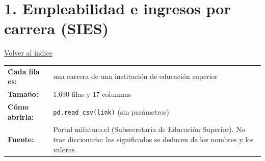 \documentclass[10.5pt]{article}
\begin{document}
\section*{1. Empleabilidad e ingresos por carrera (SIES)}
\vspace{-6pt}\hfill{\small\hyperlink{indice}{\textcolor{azuloscuro}{\underline{Volver al índice}}}}\par\vspace{2pt}
\begin{tabularx}{\linewidth}{@{}l X@{}}\textbf{Cada fila es:} & una carrera de una institución de educación superior \\\textbf{Tamaño:} & 1.690 filas y 17 columnas \\\textbf{Cómo abrirla:} & \texttt{pd.read\_\allowbreak{}csv(link)} (sin parámetros) \\\textbf{Fuente:} & Portal mifuturo.cl (Subsecretaría de Educación Superior). No trae diccionario: los significados se deducen de los nombres y los valores. \\\end{tabularx}
\vspace{6pt}
\end{document}

